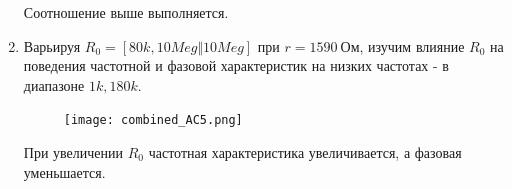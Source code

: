 \documentclass[a4paper, 12pt]{article}%
\begin{document}
\begin{enumerate}
Соотношение выше выполняется.

\item Варьируя $R_0 = [80k, 10Meg \Vert 10Meg]$ при $r = 1590 \: \textit{Ом}$, изучим влияние $R_0$ на поведения частотной и фазовой характеристик на низких частотах - в диапазоне $1k, 180k$.

\begin{figure}[h!]
\centering
\texttt{[image: combined\_AC5.png]}
\label{fig:Image1}
\end{figure}

При увеличении $R_0$ частотная характеристика увеличивается, а фазовая уменьшается.

\end{enumerate}
\end{document}
